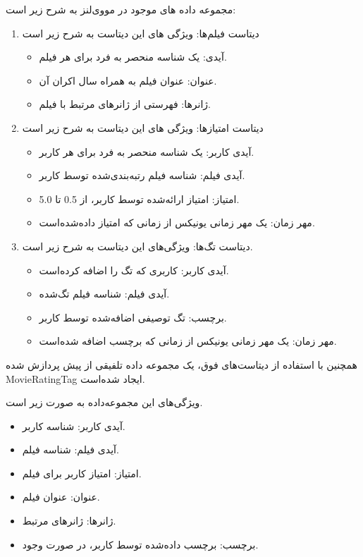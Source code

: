  مجموعه داده های موجود در مووی‌لنز به شرح زیر است:
\begin{enumerate}
\item
دیتاست فیلم‌ها:
ویژگی های این دیتاست به شرح زیر است
\begin{itemize}
\item
آیدی: یک شناسه منحصر به فرد برای هر فیلم. 
\item
عنوان: عنوان فیلم به همراه سال اکران آن. 
\item
ژانرها: فهرستی از ژانرهای مرتبط با فیلم.
\end{itemize}

\item
دیتاست امتیازها:
ویژگی های این دیتاست به شرح زیر است
\begin{itemize}
\item
آیدی کاربر: یک شناسه منحصر به فرد برای هر کاربر.
\item
آیدی فیلم: شناسه فیلم رتبه‌بندی‌شده توسط کاربر.
\item
امتیاز: امتیاز ارائه‌شده توسط کاربر، از 0.5 تا 5.0.
\item
مهر زمان: یک مهر زمانی یونیکس از زمانی که امتیاز داده‌شده‌ا‌ست.
\end{itemize}

\item
دیتاست تگ‌ها:
ویژگی‌های این دیتاست به شرح زیر است.
\begin{itemize}
\item
 آیدی کاربر: کاربری که تگ را اضافه کرده‌است.
\item
آیدی فیلم: شناسه فیلم تگ‌شده.
\item
 برچسب: تگ توصیفی اضافه‌شده توسط کاربر.
\item
مهر زمان: یک مهر زمانی یونیکس از زمانی که برچسب اضافه شده‌است.
\end{itemize}
\end{enumerate}

همچنین با استفاده از دیتاست‌های فوق، یک مجموعه داده تلفیقی از پیش پردازش شده MovieRatingTag ایجاد شده‌است.

 ویژگی‌های این مجموعه‌داده به صورت زیر است.
\begin{itemize}
\item
آیدی کاربر: شناسه کاربر.
\item
 آیدی فیلم: شناسه فیلم.
\item
 امتیاز: امتیاز کاربر برای فیلم.
\item
 عنوان: عنوان فیلم.
\item
 ژانرها: ژانرهای مرتبط.
\item
 برچسب: برچسب داده‌شده توسط کاربر، در صورت وجود.
\end{itemize}


